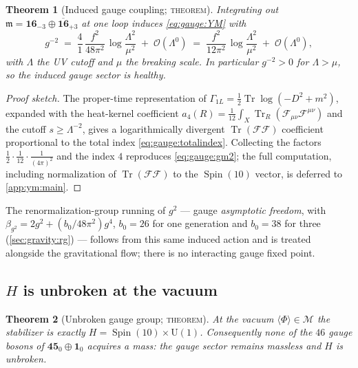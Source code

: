 \documentclass[11pt]{article}
\theoremstyle{plain}
\newtheorem{theorem}{Theorem}[section]
\theoremstyle{definition}
\theoremstyle{remark}
\newcommand{\U}[1]{\mathrm{U}(#1)}
\newcommand{\Spin}{\operatorname{Spin}}
\newcommand{\Tr}{\operatorname{Tr}}
\newcommand{\Uone}{\U{1}}
\begin{document}
\begin{theorem}[Induced gauge coupling; \textsc{theorem}]\label{thm:gauge:coupling}
Integrating out $\mathfrak m=\mathbf{16}_{-3}\oplus\overline{\mathbf{16}}_{+3}$
at one loop induces \eqref{eq:gauge:YM} with
\begin{equation}\label{eq:gauge:gm2}
  g^{-2}
  \;=\;
  \frac{4}{1}\,\frac{f^{2}}{48\pi^{2}}\,
  \log\!\frac{\Lambda^{2}}{\mu^{2}}
  \;+\;\mathcal O(\Lambda^{0})
  \;=\;
  \frac{f^{2}}{12\pi^{2}}\,\log\!\frac{\Lambda^{2}}{\mu^{2}}
  \;+\;\mathcal O(\Lambda^{0}),
\end{equation}
with $\Lambda$ the UV cutoff and $\mu$ the breaking scale. In particular
$g^{-2}>0$ for $\Lambda>\mu$, so the induced gauge sector is healthy.
\end{theorem}

\begin{proof}[Proof sketch]
The proper-time representation of $\Gamma_{1L}=\tfrac12\Tr\log(-D^2+m^2)$,
expanded with the heat-kernel coefficient
$a_4(R)=\tfrac{1}{12}\int_X\Tr_R(\mathcal F_{\mu\nu}\mathcal F^{\mu\nu})$
and the cutoff $s\ge\Lambda^{-2}$, gives a logarithmically divergent
$\Tr(\mathcal F\mathcal F)$ coefficient proportional to the total index
\eqref{eq:gauge:totalindex}. Collecting the factors $\tfrac12\cdot\tfrac1{12}\cdot\tfrac1{(4\pi)^2}$
and the index $4$ reproduces \eqref{eq:gauge:gm2}; the full computation,
including normalization of $\Tr(\mathcal F\mathcal F)$ to the
$\Spin(10)$ vector, is deferred to \autoref{app:ym:main}.
\end{proof}

The renormalization-group running of $g^{2}$ --- gauge \emph{asymptotic
freedom}, with $\beta_{g^2}=2g^2+(b_0/48\pi^2)g^4$, $b_0=26$ for one
generation and $b_0=38$ for three (\autoref{sec:gravity:rg}) --- follows
from this same induced action and is treated alongside the gravitational
flow; there is no interacting gauge fixed point.

\subsection{$H$ is unbroken at the vacuum}
\label{sec:gauge:unbroken}

\begin{theorem}[Unbroken gauge group; \textsc{theorem}]\label{thm:gauge:unbroken}
At the vacuum $\langle\Phi\rangle\in\mathcal M$ the stabilizer is exactly
$H=\Spin(10)\times\Uone$. Consequently none of the $46$ gauge bosons of
$\mathbf{45}_{0}\oplus\mathbf 1_{0}$ acquires a mass: the gauge sector
remains massless and $H$ is unbroken.
\end{theorem}
\end{document}
